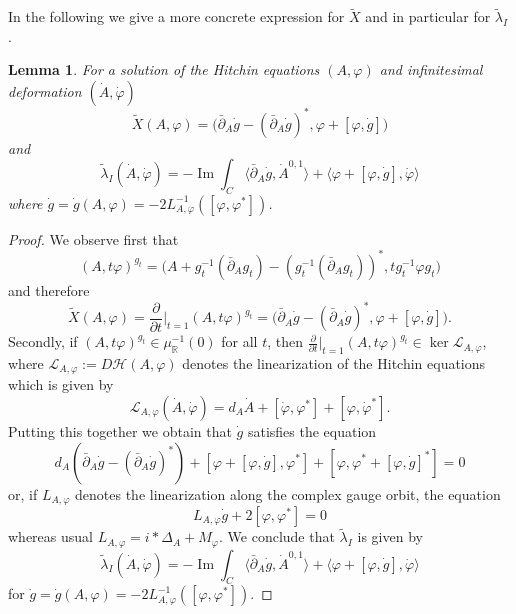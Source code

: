 \documentclass[12pt,letterpaper,reqno]{amsart}
\newtheorem{lem}[thm]{Lemma}
\theoremstyle{remark}
\theoremstyle{definition}
\numberwithin{thm}{section}
\numberwithin{equation}{section}
\numberwithin{figure}{section}
\newcommand{\R}{\ensuremath{\mathbb R}}
\DeclareMathOperator{\im}{Im}
\begin{document}
 In the following we give a more concrete expression for $\tilde X$ and in particular for $\tilde \lambda_I$.
 
 \begin{lem} For a solution of the Hitchin equations $(A,\varphi)$ and infinitesimal deformation $(\dot A, \dot \varphi)$    
 \begin{equation}\label{inf_action}
 \tilde X(A,\varphi) = \bigl( \bar\partial_A \dot g - (\bar\partial_A \dot g)^*, \varphi + [\varphi, \dot g] \bigr)
 \end{equation}
 and
 \begin{equation}\label{relprim}
 \tilde\lambda_I (\dot A, \dot \varphi) = - \im \int_C \langle \bar\partial_A \dot g, \dot A^{0,1} \rangle + \langle \varphi + [\varphi, \dot g] , \dot \varphi \rangle
\end{equation}
where $\dot g = \dot g(A,\varphi) =-2 L_{A,\varphi}^{-1}( [\varphi,\varphi^*])$.
\end{lem}

\begin{proof}
We observe first that
\[
(A, t\varphi)^{g_t} = \bigl( A+g_t^{-1}(\bar\partial_A g_t) - (g_t^{-1}(\bar\partial_A g_t))^*, t g_t^{-1}\varphi g_t \bigr)
\]
and therefore
\begin{equation*}
\tilde X(A,\varphi)=\frac{\partial}{\partial t} \Bigr \vert_{t=1} (A, t\varphi)^{g_t} 
= \bigl( \bar\partial_A \dot g - (\bar\partial_A \dot g)^*, \varphi + [\varphi, \dot g] \bigr).
\end{equation*} 
Secondly, if $(A,t\varphi)^{g_t} \in \mu_\R^{-1}(0)$ for all $t$, then $\frac{\partial}{\partial t} \bigr \vert_{t=1} (A, t\varphi)^{g_t} \in \ker \mathcal{L}_{A,\varphi}$, where  $\mathcal{L}_{A,\varphi} := D\mathcal{H}(A,\varphi)$ denotes the linearization of the Hitchin equations which is given by
 \[
  \mathcal{L}_{A,\varphi}(\dot A, \dot \varphi) = d_A \dot A + [\dot \varphi, \varphi^*] + [ \varphi, \dot \varphi^*].
 \]
Putting this together we obtain that $\dot g$ satisfies the equation
\[
d_A ( \bar\partial_A \dot g - (\bar\partial_A \dot g)^* ) + [ \varphi + [\varphi, \dot g], \varphi^*] + [ \varphi, \varphi^* + [\varphi, \dot g]^* ] = 0
\]
or, if $L_{A,\varphi}$ denotes the linearization along the complex gauge orbit, the equation
\[
L_{A,\varphi} \dot g + 2 [\varphi,\varphi^*] = 0
\]
whereas usual $L_{A,\varphi} = i \ast \Delta_A + M_\varphi$. We conclude that $\tilde \lambda_I$  is given by 
\begin{equation}
\tilde\lambda_I (\dot A, \dot \varphi) = - \im \int_C \langle \bar\partial_A \dot g, \dot A^{0,1} \rangle + \langle \varphi + [\varphi, \dot g] , \dot \varphi \rangle
\end{equation}
for  $\dot g = \dot g(A,\varphi) =-2 L_{A,\varphi}^{-1}( [\varphi,\varphi^*])$.
\end{proof}
\end{document}
